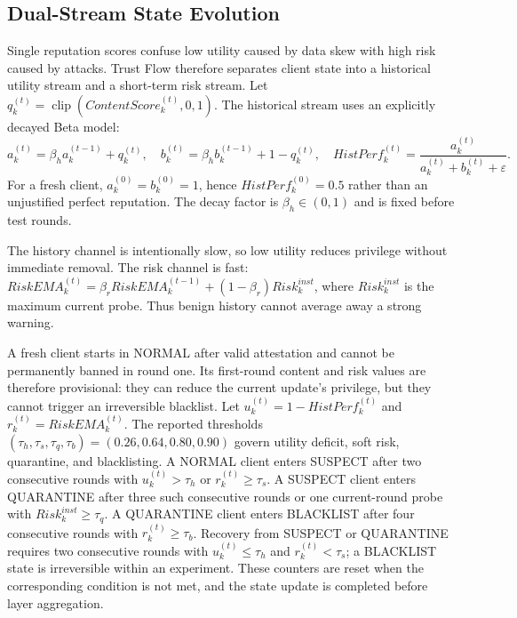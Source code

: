 \documentclass[runningheads,orivec]{llncs}
\begin{document}
\subsection{Dual-Stream State Evolution}

Single reputation scores confuse low utility caused by data skew with high risk caused by attacks. Trust Flow therefore separates client state into a historical utility stream and a short-term risk stream. Let $q_k^{(t)}=\operatorname{clip}(ContentScore_k^{(t)},0,1)$. The historical stream uses an explicitly decayed Beta model:
\begin{equation}
    a_k^{(t)}=\beta_h a_k^{(t-1)}+q_k^{(t)},\quad
    b_k^{(t)}=\beta_h b_k^{(t-1)}+1-q_k^{(t)},\quad
    HistPerf_k^{(t)}=\frac{a_k^{(t)}}{a_k^{(t)}+b_k^{(t)}+\varepsilon}.
\end{equation}
For a fresh client, $a_k^{(0)}=b_k^{(0)}=1$, hence $HistPerf_k^{(0)}=0.5$ rather than an unjustified perfect reputation. The decay factor is $\beta_h\in(0,1)$ and is fixed before test rounds.

The history channel is intentionally slow, so low utility reduces privilege without immediate removal. The risk channel is fast: $RiskEMA_k^{(t)}=\beta_rRiskEMA_k^{(t-1)}+(1-\beta_r)Risk_k^{inst}$, where $Risk_k^{inst}$ is the maximum current probe. Thus benign history cannot average away a strong warning.

    A fresh client starts in NORMAL after valid attestation and cannot be permanently banned in round one. Its first-round content and risk values are therefore provisional: they can reduce the current update's privilege, but they cannot trigger an irreversible blacklist. Let $u_k^{(t)}=1-HistPerf_k^{(t)}$ and $r_k^{(t)}=RiskEMA_k^{(t)}$. The reported thresholds $(\tau_h,\tau_s,\tau_q,\tau_b)=(0.26,0.64,0.80,0.90)$ govern utility deficit, soft risk, quarantine, and blacklisting. A NORMAL client enters SUSPECT after two consecutive rounds with $u_k^{(t)}>\tau_h$ or $r_k^{(t)}\geq\tau_s$. A SUSPECT client enters QUARANTINE after three such consecutive rounds or one current-round probe with $Risk_k^{inst}\geq\tau_q$. A QUARANTINE client enters BLACKLIST after four consecutive rounds with $r_k^{(t)}\geq\tau_b$. Recovery from SUSPECT or QUARANTINE requires two consecutive rounds with $u_k^{(t)}\leq\tau_h$ and $r_k^{(t)}<\tau_s$; a BLACKLIST state is irreversible within an experiment. These counters are reset when the corresponding condition is not met, and the state update is completed before layer aggregation.
\end{document}
